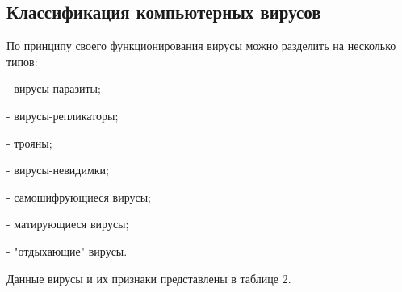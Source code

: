 \begin{longtable}{|l|l|}
    \end{longtable}

    \subsection{Классификация компьютерных вирусов}

По принципу своего функционирования вирусы можно разделить на несколько типов:

- вирусы-паразиты;

- вирусы-репликаторы;

- трояны;

- вирусы-невидимки;

- самошифрующиеся вирусы;

- матирующиеся вирусы;

- "отдыхающие" вирусы.

Данные вирусы и их признаки представлены в таблице 2.

